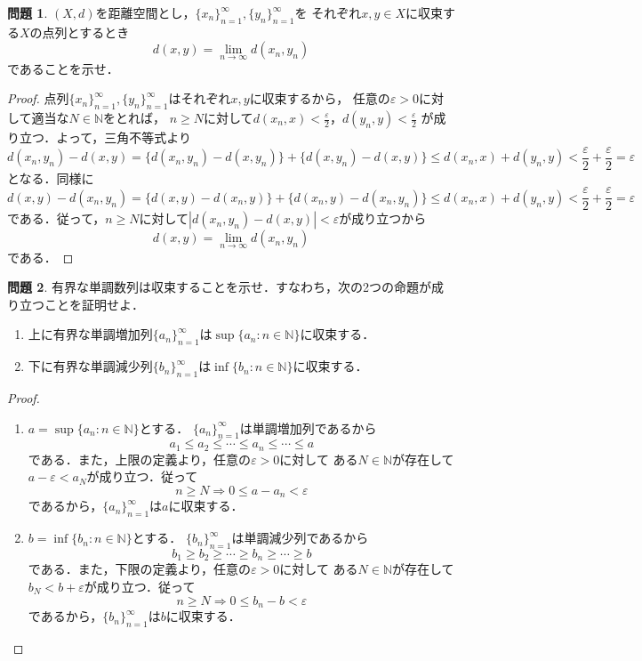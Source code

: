 \documentclass{jsarticle}
\theoremstyle{definition}
\newtheorem{qst}{問題}
\begin{document}
\begin{qst}
$(X,d)$を距離空間とし，$\{x_n\}_{n=1}^\infty,\{y_n\}_{n=1}^\infty$を
それぞれ$x,y\in X$に収束する$X$の点列とするとき
\[ d(x,y)=\lim_{n\to\infty}d(x_n,y_n) \]
であることを示せ．
\end{qst}
\begin{proof}
点列$\{x_n\}_{n=1}^\infty,\{y_n\}_{n=1}^\infty$はそれぞれ$x,y$に収束するから，
任意の$\varepsilon>0$に対して適当な$N\in\mathbb{N}$をとれば，
$n\geq N$に対して$d(x_n,x)<\frac{\varepsilon}{2}$，$d(y_n,y)<\frac{\varepsilon}{2}$
が成り立つ．よって，三角不等式より
\[
d(x_n,y_n)-d(x,y)
=\{d(x_n,y_n)-d(x,y_n)\}+\{d(x,y_n)-d(x,y)\}
\leq d(x_n,x)+d(y_n,y)
<\frac{\varepsilon}{2}+\frac{\varepsilon}{2}
=\varepsilon
\]
となる．同様に
\[
d(x,y)-d(x_n,y_n)
=\{d(x,y)-d(x_n,y)\}+\{d(x_n,y)-d(x_n,y_n)\}
\leq d(x_n,x)+d(y_n,y)
<\frac{\varepsilon}{2}+\frac{\varepsilon}{2}
=\varepsilon
\]
である．従って，$n\geq N$に対して$|d(x_n,y_n)-d(x,y)|<\varepsilon$が成り立つから
\[ d(x,y)=\lim_{n\to\infty}d(x_n,y_n) \]
である．
\end{proof}

\begin{qst}
有界な単調数列は収束することを示せ．すなわち，次の2つの命題が成り立つことを証明せよ．
\begin{enumerate}
\item 上に有界な単調増加列$\{a_n\}_{n=1}^\infty$は$\sup\{a_n:n\in\mathbb{N}\}$に収束する．
\item 下に有界な単調減少列$\{b_n\}_{n=1}^\infty$は$\inf\{b_n:n\in\mathbb{N}\}$に収束する．
\end{enumerate}
\end{qst}
\begin{proof}
\begin{enumerate}
\item$a=\sup\{a_n:n\in\mathbb{N}\}$とする．
$\{a_n\}_{n=1}^\infty$は単調増加列であるから
\[ a_1\leq a_2\leq\cdots\leq a_n\leq\cdots\leq a \]
である．また，上限の定義より，任意の$\varepsilon>0$に対して
ある$N\in\mathbb{N}$が存在して$a-\varepsilon<a_N$が成り立つ．従って
\[ n\geq N\Rightarrow 0\leq a-a_n<\varepsilon \]
であるから，$\{a_n\}_{n=1}^\infty$は$a$に収束する．
\item$b=\inf\{b_n:n\in\mathbb{N}\}$とする．
$\{b_n\}_{n=1}^\infty$は単調減少列であるから
\[ b_1\geq b_2\geq\cdots\geq b_n\geq\cdots\geq b \]
である．また，下限の定義より，任意の$\varepsilon>0$に対して
ある$N\in\mathbb{N}$が存在して$b_N<b+\varepsilon$が成り立つ．従って
\[ n\geq N\Rightarrow 0\leq b_n-b<\varepsilon \]
であるから，$\{b_n\}_{n=1}^\infty$は$b$に収束する．
\end{enumerate}
\end{proof}
\end{document}
